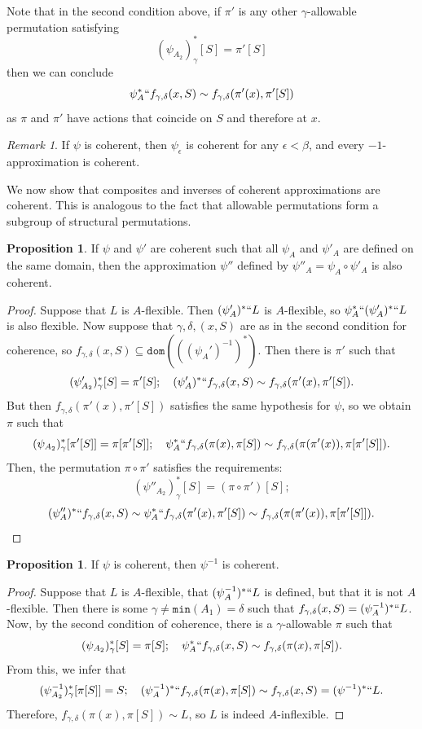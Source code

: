 \documentclass{article}
\theoremstyle{definition}
\newtheorem{proposition}[theorem]{Proposition}
\theoremstyle{remark}
\newtheorem{remark}[theorem]{Remark}
\begin{document}
{Note that in the second condition above, if $\pi'$ is any other $\gamma$-allowable permutation satisfying
$$ (\psi_{A_2})_\gamma^*[S] = \pi'[S] $$
then we can conclude
$$ \psi_A^* `` f_{\gamma,\delta}(x, S) \sim f_{\gamma,\delta}(\pi'(x), \pi'[S]) $$
as $\pi$ and $\pi'$ have actions that coincide on $S$ and therefore at $x$.
\begin{remark}\label{rk:deriv_coherent}
  If $\psi$ is coherent, then $\psi_\epsilon$ is coherent for any $\epsilon < \beta$, and every $-1$-approximation is coherent.
\end{remark}
We now show that composites and inverses of coherent approximations are coherent.
This is analogous to the fact that allowable permutations form a subgroup of structural permutations.
\begin{proposition}\label{prop:compose_coherent}
  If $\psi$ and $\psi'$ are coherent such that all $\psi_A$ and $\psi'_A$ are defined on the same domain, then the approximation $\psi''$ defined by $\psi''_A = \psi_A \circ \psi'_A$ is also coherent.
\end{proposition}
\begin{proof}
  Suppose that $L$ is $A$-flexible.
  Then $(\psi'_A)^*``L$ is $A$-flexible, so $\psi_A^*`` (\psi'_A)^*`` L$ is also flexible.
  Now suppose that $\gamma, \delta, (x, S)$ are as in the second condition for coherence, so $f_{\gamma,\delta}(x,S) \subseteq \mathtt{dom}(((\psi_A')^{-1})^*)$.
  Then there is $\pi'$ such that
  $$ (\psi'_{A_2})_\gamma^*[S] = \pi'[S];\quad (\psi_A')^* `` f_{\gamma,\delta}(x,S) \sim f_{\gamma,\delta}(\pi'(x), \pi'[S]). $$
  But then $f_{\gamma,\delta}(\pi'(x), \pi'[S])$ satisfies the same hypothesis for $\psi$, so we obtain $\pi$ such that
  $$ (\psi_{A_2})_\gamma^*[\pi'[S]] = \pi[\pi'[S]];\quad \psi_A^* `` f_{\gamma,\delta}(\pi(x),\pi[S]) \sim f_{\gamma,\delta}(\pi(\pi'(x)), \pi[\pi'[S]]). $$
  Then, the permutation $\pi \circ \pi'$ satisfies the requirements:
  $$ (\psi''_{A_2})^*_\gamma[S] = (\pi \circ \pi')[S]; $$
  $$ (\psi''_A)^* `` f_{\gamma,\delta}(x,S) \sim \psi_A^* `` f_{\gamma,\delta}(\pi'(x), \pi'[S]) \sim f_{\gamma,\delta}(\pi(\pi'(x)), \pi[\pi'[S]]). \qedhere $$
\end{proof}
\begin{proposition}\label{prop:inverse_coherent}
  If $\psi$ is coherent, then $\psi^{-1}$ is coherent.
\end{proposition}
\begin{proof}
  Suppose that $L$ is $A$-flexible, that $(\psi^{-1}_A)^*``L$ is defined, but that it is not $A$-flexible.
  Then there is some $\gamma \neq \mathtt{min}(A_1) = \delta$ such that $f_{\gamma,\delta}(x,S) = (\psi^{-1}_A)^*``L$.
  Now, by the second condition of coherence, there is a $\gamma$-allowable $\pi$ such that
  $$ (\psi_{A_2})_\gamma^*[S] = \pi[S];\quad \psi_A^* `` f_{\gamma,\delta}(x, S) \sim f_{\gamma,\delta}(\pi(x), \pi[S]). $$
  From this, we infer that
  $$ (\psi^{-1}_{A_2})_\gamma^*[\pi[S]] = S;\quad (\psi^{-1}_A)^* `` f_{\gamma,\delta}(\pi(x), \pi[S]) \sim f_{\gamma,\delta}(x, S) = (\psi^{-1})^*``L. $$
  Therefore, $f_{\gamma,\delta}(\pi(x), \pi[S]) \sim L$, so $L$ is indeed $A$-inflexible.


\end{proof}}
\end{document}
